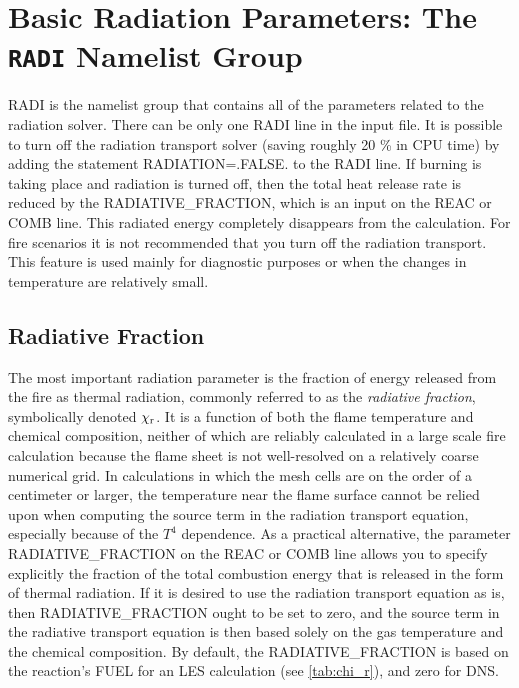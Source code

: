 \documentclass[11pt]{book}
\begin{document}
\section{Basic Radiation Parameters: The \texorpdfstring{{\tt RADI}}{RADI} Namelist Group}
\label{info:RADI}

{\ct RADI} is the namelist group that contains all of the parameters related to the radiation solver. There can be only one {\ct RADI} line in the input file. It is possible to turn off the radiation transport solver (saving roughly 20 \% in CPU time) by adding the statement {\ct RADIATION=.FALSE.} to the {\ct RADI} line.  If burning is taking place and radiation is turned off, then the total heat release rate is reduced by the {\ct RADIATIVE\_FRACTION}, which is an input on the {\ct REAC} or {\ct COMB} line. This radiated energy completely disappears from the calculation. For fire scenarios it is not recommended that you turn off the radiation transport. This feature is used mainly for diagnostic purposes or when the changes in temperature are relatively small.

\subsection{Radiative Fraction}
\label{info:CHI_R}
\label{ramp_chi_r}

The most important radiation parameter is the fraction of energy released from the fire as thermal radiation, commonly referred to as the {\em radiative fraction}, symbolically denoted $\chi_{\rm r}$. It is a function of both the flame temperature and chemical composition, neither of which are reliably calculated in a large scale fire calculation because the flame sheet is not well-resolved on a relatively coarse numerical grid. In calculations in which the mesh cells are on the order of a centimeter or larger, the temperature near the flame surface cannot be relied upon when computing the source term in the radiation transport equation, especially because of the $T^4$ dependence. As a practical alternative, the parameter {\ct RADIATIVE\_FRACTION} on the {\ct REAC} or {\ct COMB} line allows you to specify explicitly the fraction of the total combustion energy that is released in the form of thermal radiation. If it is desired to use the radiation transport equation as is, then {\ct RADIATIVE\_FRACTION} ought to be set to zero, and the source term in the radiative transport equation is then based solely on the gas temperature and the chemical composition. By default, the {\ct RADIATIVE\_FRACTION} is based on the reaction's {\ct FUEL} for an LES calculation (see \ref{tab:chi_r}), and zero for DNS.
\end{document}
